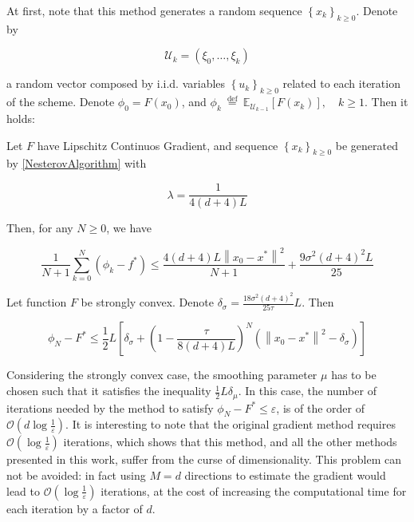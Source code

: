 At first, note that this method generates a random sequence $ \left\{x_{k}\right\}_{k \geq 0} . $ Denote by

\begin{equation}
	\mathcal{U}_{k}=\left(\xi_{0}, \ldots, \xi_{k}\right)
\end{equation}

a random vector composed by i.i.d. variables $ \left\{u_{k}\right\}_{k \geq 0} $ related to each iteration of the scheme. Denote $ \phi_{0}=F\left(x_{0}\right) $, and $ \phi_{k} \stackrel{\text { def }}{=} \mathbb{E}_{\mathcal{U}_{k-1}}\left[ F\left(x_{k}\right)\right],\quad k \geq 1 $. Then it holds:

\begin{thm}
	Let $ F $ have Lipschitz Continuos Gradient, and sequence $ \left\{x_{k}\right\}_{k \geq 0} $ be generated by \ref{NesterovAlgorithm} with
	
	\begin{equation}
		\lambda=\frac{1}{4(d+4) L}
	\end{equation}

	Then, for any $ N \geq 0 $, we have
	
	\begin{equation}
		\frac{1}{N+1} \sum_{k=0}^{N}\left(\phi_{k}-f^{*}\right) \leq \frac{4(d+4) L\left\|x_{0}-x^{*}\right\|^{2}}{N+1}+\frac{9 \sigma^{2}(d+4)^{2} L}{25}
	\end{equation}

	Let function $F$ be strongly convex. Denote $ \delta_{\sigma}=\frac{18 \sigma^{2}(d+4)^{2}}{25 \tau} L . $ Then
	
	\begin{equation}
		\phi_{N}-F^{*} \leq \frac{1}{2} L\left[\delta_{\sigma}+\left(1-\frac{\tau}{8(d+4) L}\right)^{N}\left(\left\|x_{0}-x^{*}\right\|^{2}-\delta_{\sigma}\right)\right]
	\end{equation}

\end{thm}

Considering the strongly convex case, the smoothing parameter $\mu$ has to be chosen such that it satisfies the inequality $\frac{1}{2}L\delta_\mu$. In this case, the number of iterations needed by the method to satisfy $\phi_{N}-F^{*} \leq \varepsilon$, is of the order of $\mathcal{O}(d\log\frac{1}{\varepsilon})$. It is interesting to note that the original gradient method requires $\mathcal{O}(\log\frac{1}{\varepsilon})$ iterations, which shows that this method, and all the other methods presented in this work, suffer from the curse of dimensionality. This problem can not be avoided: in fact using $M=d$ directions to estimate the gradient would lead to $\mathcal{O}(\log\frac{1}{\varepsilon})$ iterations, at the cost of increasing the computational time for each iteration by a factor of $d$.

